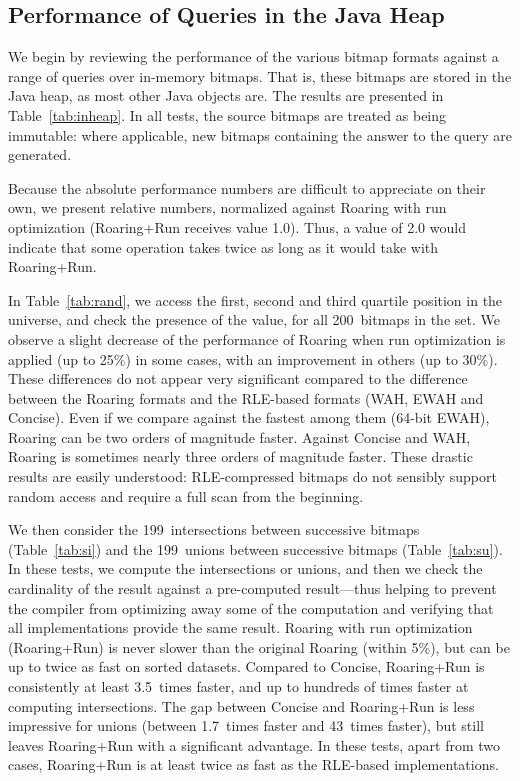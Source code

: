 \documentclass[times]{speauth}
\begin{document}
\subsection{Performance of Queries in the Java Heap}
\label{sec:perfheap}

We begin by reviewing the performance of the various
bitmap formats against a range of queries over in-memory bitmaps.
That is, these bitmaps are stored in the Java heap, as most  other
Java objects are.
The results are presented in Table~\ref{tab:inheap}.
In all tests, the source bitmaps are treated as being immutable:
where applicable, new bitmaps containing the answer to the query
are generated.

Because the absolute performance numbers are difficult to
appreciate on their own, we present relative numbers, normalized against
Roaring with run optimization (Roaring+Run  receives value 1.0). Thus, a value of 2.0 would indicate that some operation takes twice as long as it would take with Roaring+Run.



In Table~\ref{tab:rand}, we access the first, second and third quartile position in the universe, and check the presence of the value, for all 200~bitmaps in the set. We observe a slight
decrease of the performance of Roaring when run optimization is
applied (up to 25\%) in some cases, with an improvement in others
(up to 30\%). These differences do not appear very significant
compared to the difference between the Roaring formats and the RLE-based
formats (WAH, EWAH and Concise). Even if we compare against the fastest among them (64-bit EWAH), Roaring can be two orders of magnitude faster. Against Concise and WAH, Roaring is sometimes nearly three orders of magnitude faster.
These drastic results are easily understood: RLE-compressed bitmaps do not sensibly support random access and require a full scan from the beginning.

We then consider the 199~intersections between successive bitmaps (Table~\ref{tab:si}) and the 199~unions between successive bitmaps (Table~\ref{tab:su}). In these tests, we compute the intersections or unions, and then we check
the cardinality of the result against a pre-computed result---thus helping to  prevent  the compiler from optimizing away some of the computation and verifying that all implementations provide the same result.
 Roaring with run optimization (Roaring+Run) is never slower than the original Roaring (within 5\%), but can be up to twice as fast on sorted datasets. Compared to Concise, Roaring+Run is consistently at least 3.5~times faster, and up to hundreds of times faster at computing intersections. The gap between Concise and Roaring+Run is less impressive for unions (between 1.7~times faster and 43~times faster), but still leaves Roaring+Run with a significant advantage.
In these tests,
apart from two cases, Roaring+Run is at least twice as fast as the RLE-based implementations.
\end{document}
